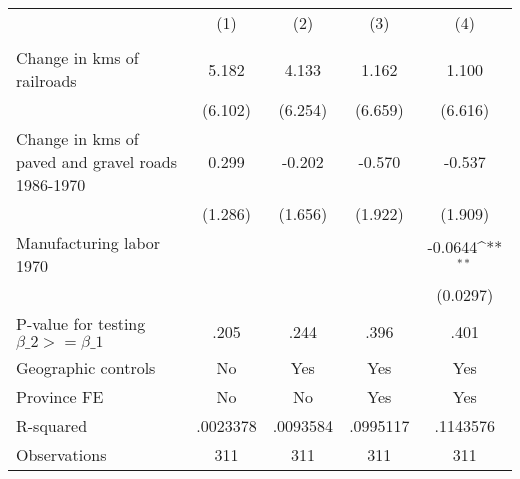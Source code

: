 {
\def\sym#1{\ifmmode^{#1}\else\(^{#1}\)\fi}
\begin{tabular}{l*{4}{c}}
\hline\hline
                &\multicolumn{1}{c}{(1)}&\multicolumn{1}{c}{(2)}&\multicolumn{1}{c}{(3)}&\multicolumn{1}{c}{(4)}\\
                &\multicolumn{1}{c}{}&\multicolumn{1}{c}{}&\multicolumn{1}{c}{}&\multicolumn{1}{c}{}\\
\hline
Change in kms of railroads&    5.182         &    4.133         &    1.162         &    1.100         \\
                &  (6.102)         &  (6.254)         &  (6.659)         &  (6.616)         \\
[1em]
Change in kms of paved and gravel roads 1986-1970&    0.299         &   -0.202         &   -0.570         &   -0.537         \\
                &  (1.286)         &  (1.656)         &  (1.922)         &  (1.909)         \\
[1em]
Manufacturing labor 1970&                  &                  &                  &  -0.0644\sym{**} \\
                &                  &                  &                  & (0.0297)         \\
\hline
P-value for testing $\beta\_{2} >= \beta\_{1}$&     .205         &     .244         &     .396         &     .401         \\
Geographic controls&       No         &      Yes         &      Yes         &      Yes         \\
Province FE     &       No         &       No         &      Yes         &      Yes         \\
R-squared       & .0023378         & .0093584         & .0995117         & .1143576         \\
Observations    &      311         &      311         &      311         &      311         \\
\hline\hline
\end{tabular}
}
